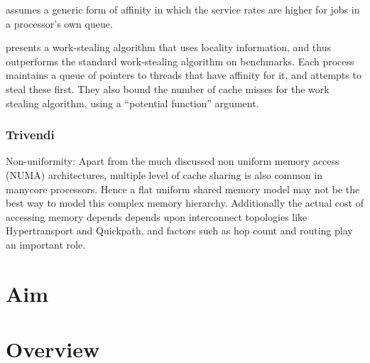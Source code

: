 \cite{Squillante2001} assumes a generic form of affinity in which the
service rates are higher for jobs in a processor's own queue.

\cite{Acar2002} presents a work-stealing algorithm that uses locality
information, and thus outperforms the standard work-stealing algorithm
on benchmarks. Each process maintains a queue of pointers to threads
that have affinity for it, and attempts to steal these first. They
also bound the number of cache misses for the work stealing algorithm,
using a ``potential function'' argument.

\subsubsection{Trivendi}

Non-uniformity: Apart from the much discussed non uniform memory
access (NUMA) architectures, multiple level of cache sharing is also
common in manycore processors. Hence a flat uniform shared memory
model may not be the best way to model this complex memory hierarchy.
Additionally the actual cost of accessing memory depends depends upon
interconnect topologies like Hypertransport and Quickpath, and factors
such as hop count and routing play an important role.

\section{Aim}
\label{sec:locality-intro-aim}


\section{Overview}
\label{sec:locality-intro-overview}


